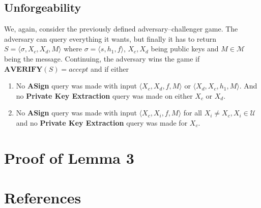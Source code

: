 \documentclass[final]{IEEEtran}%
\newcommand{\goedel}[1]{\langle #1 \rangle}
\newcommand{\mespace}{\mathcal{M}}
\newcommand{\uspace}{\mathcal{U}}
\begin{document}
    \subsection{Unforgeability}
      We, again, consider the previously defined adversary--challenger game.
      The adversary can query everything it wants, but finally it has to return \(S=\goedel{\sigma, X_c, X_d, M}\) where \(\sigma=\goedel{s, h_1, f}\), \(X_c, X_d\) being public keys and \(M\in\mespace\) being the message.
      Continuing, the adversary wins the game if \(\textbf{AVERIFY}(S) = accept\) and if either
        \begin{enumerate}
          \item No \textbf{ASign} query was made with input \(\goedel{X_c, X_d, f, M}\) or \(\goedel{X_d, X_c, h_1, M}\).
                And no \textbf{Private Key Extraction} query was made on either \(X_c\) or \(X_d\).
          \item No \textbf{ASign} query was made with input \(\goedel{X_c, X_i, f, M}\) for all \(X_i \neq X_c, X_i\in\uspace\) and no \textbf{Private Key Extraction} query was made for \(X_c\).
        \end{enumerate}

\section{Proof of Lemma 3}

\section*{References}



\end{document}
